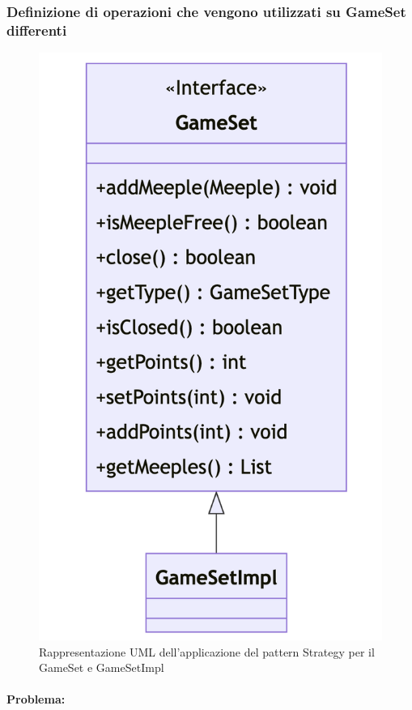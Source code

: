 \subsubsection*{Definizione di operazioni che vengono utilizzati su GameSet differenti}
\begin{figure}[h]
    \centering\includegraphics[scale=.4]{images/gameset.png}
    \caption{Rappresentazione UML dell'applicazione del pattern Strategy per il GameSet e GameSetImpl}
\end{figure}
\paragraph{Problema:}

